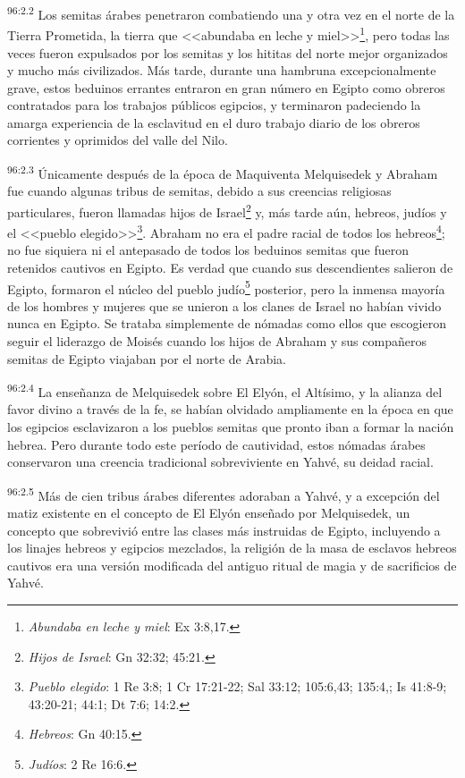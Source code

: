 \par
\textsuperscript{96:2.2} Los semitas árabes penetraron combatiendo una y otra vez en el norte de la Tierra Prometida, la tierra que <<abundaba en leche y miel>>\footnote{\textit{Abundaba en leche y miel}: Ex 3:8,17.}, pero todas las veces fueron expulsados por los semitas y los hititas del norte mejor organizados y mucho más civilizados. Más tarde, durante una hambruna excepcionalmente grave, estos beduinos errantes entraron en gran número en Egipto como obreros contratados para los trabajos públicos egipcios, y terminaron padeciendo la amarga experiencia de la esclavitud en el duro trabajo diario de los obreros corrientes y oprimidos del valle del Nilo.

\par
\textsuperscript{96:2.3} Únicamente después de la época de Maquiventa Melquisedek y Abraham fue cuando algunas tribus de semitas, debido a sus creencias religiosas particulares, fueron llamadas hijos de Israel\footnote{\textit{Hijos de Israel}: Gn 32:32; 45:21.} y, más tarde aún, hebreos, judíos y el <<pueblo elegido>>\footnote{\textit{Pueblo elegido}: 1 Re 3:8; 1 Cr 17:21-22; Sal 33:12; 105:6,43; 135:4,; Is 41:8-9; 43:20-21; 44:1; Dt 7:6; 14:2.}. Abraham no era el padre racial de todos los hebreos\footnote{\textit{Hebreos}: Gn 40:15.}; no fue siquiera ni el antepasado de todos los beduinos semitas que fueron retenidos cautivos en Egipto. Es verdad que cuando sus descendientes salieron de Egipto, formaron el núcleo del pueblo judío\footnote{\textit{Judíos}: 2 Re 16:6.} posterior, pero la inmensa mayoría de los hombres y mujeres que se unieron a los clanes de Israel no habían vivido nunca en Egipto. Se trataba simplemente de nómadas como ellos que escogieron seguir el liderazgo de Moisés cuando los hijos de Abraham y sus compañeros semitas de Egipto viajaban por el norte de Arabia.

\par
\textsuperscript{96:2.4} La enseñanza de Melquisedek sobre El Elyón, el Altísimo, y la alianza del favor divino a través de la fe, se habían olvidado ampliamente en la época en que los egipcios esclavizaron a los pueblos semitas que pronto iban a formar la nación hebrea. Pero durante todo este período de cautividad, estos nómadas árabes conservaron una creencia tradicional sobreviviente en Yahvé, su deidad racial.

\par
\textsuperscript{96:2.5} Más de cien tribus árabes diferentes adoraban a Yahvé, y a excepción del matiz existente en el concepto de El Elyón enseñado por Melquisedek, un concepto que sobrevivió entre las clases más instruidas de Egipto, incluyendo a los linajes hebreos y egipcios mezclados, la religión de la masa de esclavos hebreos cautivos era una versión modificada del antiguo ritual de magia y de sacrificios de Yahvé.

